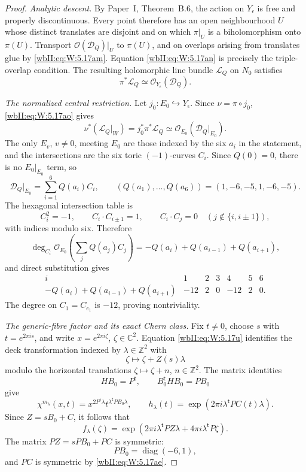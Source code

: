 \begin{proof}
\emph{Analytic descent.}
By Paper~I, Theorem~B.6, the action on \(Y_\epsilon\) is
free and properly discontinuous.  Every point therefore has an open
neighbourhood \(U\) whose distinct translates are disjoint and on which
\(\pi|_U\) is a biholomorphism onto \(\pi(U)\).  Transport
\(\mathcal O(\mathcal D_Q)|_U\) to \(\pi(U)\), and on overlaps arising
from translates glue by \eqref{wbII:eq:W:5.17am}.  Equation \eqref{wbII:eq:W:5.17an} is precisely the
triple-overlap condition.  The resulting holomorphic line bundle
\(\mathcal L_Q\) on \(N_0\) satisfies
\[
 \pi^*\mathcal L_Q
 \simeq\mathcal O_{Y_\epsilon}(\mathcal D_Q).
\tag{W.82}\label{wbII:eq:W:5.17ao}
\]

\emph{The normalized central restriction.}
Let \(j_0:E_0\hookrightarrow Y_\epsilon\).  Since
\(\nu=\pi\circ j_0\), \eqref{wbII:eq:W:5.17ao} gives
\[
 \nu^*(\mathcal L_Q|_W)
 =j_0^*\pi^*\mathcal L_Q
 \simeq\mathcal O_{E_0}(\mathcal D_Q|_{E_0}).
\tag{W.83}\label{wbII:eq:W:5.17ap}
\]
The only \(E_v\), \(v\ne0\), meeting \(E_0\) are those indexed by the
six \(a_i\) in the statement, and the intersections are the six toric
\((-1)\)-curves \(C_i\).  Since \(Q(0)=0\), there is no
\(E_0|_{E_0}\) term, so
\[
 \mathcal D_Q|_{E_0}
 =\sum_{i=1}^6Q(a_i)C_i,
 \qquad
 (Q(a_1),\ldots,Q(a_6))=(1,-6,-5,1,-6,-5).
\tag{W.84}\label{wbII:eq:W:5.17aq}
\]
The hexagonal intersection table is
\[
 C_i^2=-1,
 \qquad
 C_i\cdot C_{i\pm1}=1,
 \qquad
 C_i\cdot C_j=0
 \quad(j\notin\{i,i\pm1\}),
\tag{W.85}\label{wbII:eq:W:5.17ar}
\]
with indices modulo six.  Therefore
\[
 \deg_{C_i}\mathcal O_{E_0}
 \!\left(\sum_jQ(a_j)C_j\right)
 =-Q(a_i)+Q(a_{i-1})+Q(a_{i+1}),
\]
and direct substitution gives
\[
 \begin{array}{c|rrrrrr}
 i&1&2&3&4&5&6\\ \hline
 -Q(a_i)+Q(a_{i-1})+Q(a_{i+1})
 &-12&2&0&-12&2&0.
 \end{array}
\tag{W.86}\label{wbII:eq:W:5.17as}
\]
The degree on \(C_1=C_{e_1}\) is \(-12\), proving nontriviality.

\emph{The generic-fibre factor and its exact Chern class.}
Fix \(t\ne0\), choose \(s\) with \(t=e^{2\pi i s}\), and write
\(x=e^{2\pi i\zeta}\), \(\zeta\in\mathbb C^2\).
Equation \eqref{wbII:eq:W:5.17u} identifies the deck transformation indexed by
\(\lambda\in\mathbb Z^2\) with
\[
 \zeta\longmapsto\zeta+Z(s)\lambda
\]
modulo the horizontal translations
\(\zeta\mapsto\zeta+n\), \(n\in\mathbb Z^2\).  The matrix identities
\[
 HB_0=P^{\mathsf t},
 \qquad
 B_0^{\mathsf t}HB_0=PB_0
\tag{W.87}\label{wbII:eq:W:5.17at}
\]
give
\[
 \chi^{m_\lambda}(x,t)
 =x^{2P^{\mathsf t}\lambda}
  t^{\lambda^{\mathsf t}PB_0\lambda},
\qquad
 h_\lambda(t)
 =\exp(2\pi i\lambda^{\mathsf t}PC(t)\lambda).
\]
Since \(Z=sB_0+C\), it follows that
\[
 f_\lambda(\zeta)
 =\exp\!\left(
 2\pi i\lambda^{\mathsf t}PZ\lambda+
 4\pi i\lambda^{\mathsf t}P\zeta\right).
\tag{W.88}\label{wbII:eq:W:5.17au}
\]
The matrix \(PZ=sPB_0+PC\) is symmetric:
\[
 PB_0=\operatorname{diag}(-6,1),
\]
and \(PC\) is symmetric by \eqref{wbII:eq:W:5.17ae}.


\end{proof}
